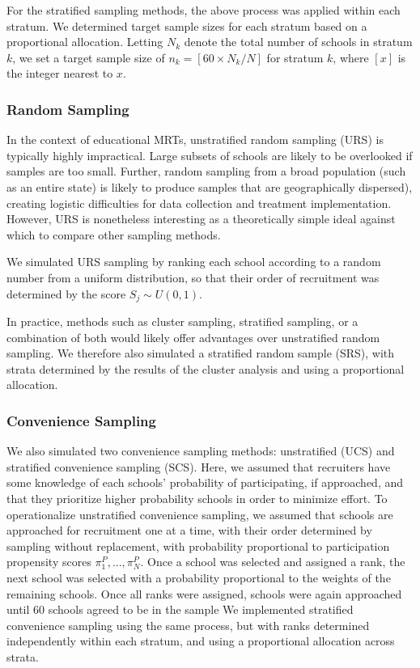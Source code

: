 \documentclass[man,floatsintext]{apa6}
\begin{document}
For the stratified sampling methods, the above process was applied within each stratum. We determined target sample sizes for each stratum based on a proportional allocation. Letting \(N_k\) denote the total number of schools in stratum \(k\), we set a target sample size of \(n_k = [60 \times N_k / N]\) for stratum \(k\), where \([x]\) is the integer nearest to \(x\).

\hypertarget{random-sampling}{%
\subsubsection{Random Sampling}\label{random-sampling}}

In the context of educational MRTs, unstratified random sampling (URS) is typically highly impractical. Large subsets of schools are likely to be overlooked if samples are too small. Further, random sampling from a broad population (such as an entire state) is likely to produce samples that are geographically dispersed), creating logistic difficulties for data collection and treatment implementation. However, URS is nonetheless interesting as a theoretically simple ideal against which to compare other sampling methods.

We simulated URS sampling by ranking each school according to a random number from a uniform distribution, so that their order of recruitment was determined by the score \(S_j \sim U(0, 1)\).

In practice, methods such as cluster sampling, stratified sampling, or a combination of both would likely offer advantages over unstratified random sampling. We therefore also simulated a stratified random sample (SRS), with strata determined by the results of the cluster analysis and using a proportional allocation.

\hypertarget{convenience-sampling}{%
\subsubsection{Convenience Sampling}\label{convenience-sampling}}

We also simulated two convenience sampling methods: unstratified (UCS) and stratified convenience sampling (SCS). Here, we assumed that recruiters have some knowledge of each schools' probability of participating, if approached, and that they prioritize higher probability schools in order to minimize effort.
To operationalize unstratified convenience sampling, we assumed that schools are approached for recruitment one at a time, with their order determined by sampling without replacement, with probability proportional to participation propensity scores \(\pi^P_1,...,\pi^P_N\).
Once a school was selected and assigned a rank, the next school was selected with a probability proportional to the weights of the remaining schools. Once all ranks were assigned, schools were again approached until 60 schools agreed to be in the sample
We implemented stratified convenience sampling using the same process, but with ranks determined independently within each stratum, and using a proportional allocation across strata.
\end{document}
